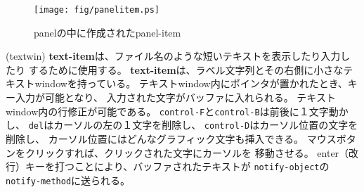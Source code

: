 \begin{figure}
\begin{center}
\texttt{[image: fig/panelitem.ps]}
\end{center}
\caption{panelの中に作成されたpanel-item\label{panelitem}}
\end{figure}

\begin{refdesc}
{(textwin)}{
{\bf text-item}は、ファイル名のような短いテキストを表示したり入力したり
するために使用する。
{\bf text-item}は、ラベル文字列とその右側に小さなテキストwindowを持っている。
テキストwindow内にポインタが置かれたとき、キー入力が可能となり、
入力された文字がバッファに入れられる。
テキストwindow内の行修正が可能である。
{\tt control-F}と{\tt control-B}は前後に１文字動かし、
{\tt del}はカーソルの左の１文字を削除し、
{\tt control-D}はカーソル位置の文字を削除し、
カーソル位置にはどんなグラフィック文字も挿入できる。
マウスボタンをクリックすれば、クリックされた文字にカーソルを
移動させる。
enter（改行）キーを打つことにより、バッファされたテキストが
{\tt notify-object}の{\tt notify-method}に送られる。}




\end{refdesc}

